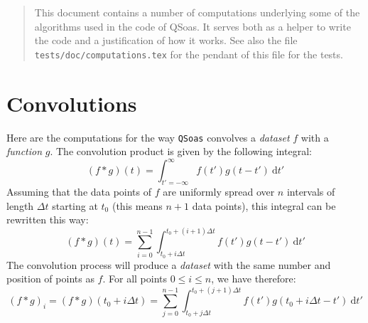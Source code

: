\documentclass{article}
\newcommand{\dd}{\mathrm{d}}
\begin{document}
\begin{abstract}
  This document contains a number of computations underlying some of
  the algorithms used in the code of QSoas. It serves both as a helper
  to write the code and a justification of how it works. See also the
  file \texttt{tests/doc/computations.tex} for the pendant of this
  file for the tests.
\end{abstract}

\section{Convolutions}

Here are the computations for the way \texttt{QSoas} convolves a
\emph{dataset} $f$ with a \emph{function} $g$. The convolution product
is given by the following integral:
%
\begin{equation}
  (f*g)(t) = \int_{t' = -\infty}^{\infty} f(t') g(t-t')\:\dd t'
\end{equation}
%
Assuming that the data points of $f$ are uniformly spread over $n$
intervals of length $\Delta t$ starting at $t_0$ (this means $n+1$
data points), this integral can be rewritten this way:
%
\begin{equation}
  (f*g)(t) = \sum_{i = 0}^{n-1}
  \int_{t_0 + i \Delta t}^{t_0 + (i+1) \Delta t}
  f(t') g(t-t')\:\dd t'
\end{equation}
%
The convolution process will produce a \emph{dataset} with the same
number and position of points as $f$. For all points $0 \leq i \leq n$, we have
therefore:
%
\begin{equation}
  (f*g)_i = (f*g)(t_0 + i\Delta t) = 
  \sum_{j = 0}^{n-1} \int_{t_0 + j \Delta t}^{t_0 + (j+1) \Delta t}
  f(t') g(t_0 + i\Delta t-t')\:\dd t'
\end{equation}
\end{document}
